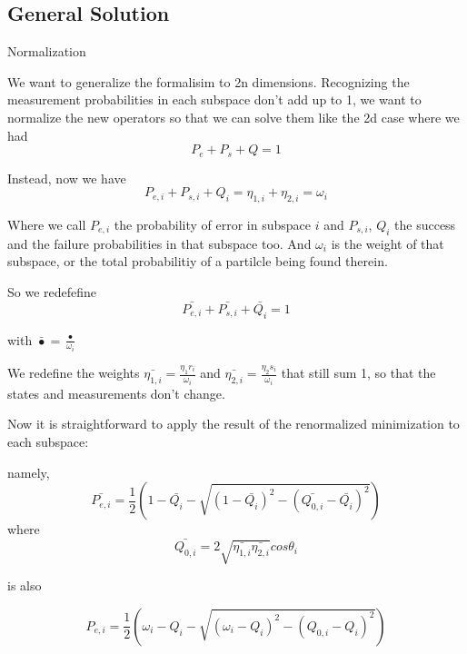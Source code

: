 \documentclass{beamer}
\begin{document}
\subsection{General Solution}

\begin{frame}{Normalization}

We want to generalize the formalisim to 2n dimensions.   Recognizing the measurement probabilities in each subspace don't add up to 1, we want to normalize the new operators so that we can solve them like the 2d case where we had
\[P_e+ P_s+ Q= 1\]

Instead, now we have
\[P_{e,i} + P_{s,i} + Q_i = \eta_{1,i} + \eta_{2,i} = \omega_i\]

Where we call $P_{e,i}$ the probability of error in subspace $i$ and $P_{s,i}$, $Q_i$ the success and the failure probabilities in that subspace too.  And $\omega_i$ is the weight of that subspace, or the total probabilitiy of a partilcle being found therein.

\end{frame}
\begin{frame}

So we redefefine
\[ \bar{P_{e,i}} +\bar{P_{s,i}} + \bar{Q_i} = 1 \]

with $ \bar{\bullet} = \frac{\bullet}{\omega_i} $

We redefine the weights $\bar{\eta_{1,i}} = \frac{\eta_1 r_i}{  \omega_i }$ and $ \bar{\eta_{2,i}} = \frac{ \eta_2 s_i }{\omega_i}$ that still sum 1, so that the states and measurements don't change.
\end{frame}
\begin{frame}

Now it is straightforward to apply the result of the renormalized minimization to each subspace: 

namely,
 \[\bar{P_{e,i}} = \frac{1}{2}( 1-\bar{Q_i} - \sqrt{(1-\bar{Q_i})^2 - (\bar{Q_{0,i}} -\bar{ Q_i})^2})\] where 
\[\bar{Q_{0,i}} = 2 \sqrt{\bar{\eta_{1,i}}\bar{\eta_{2,i}}}cos\theta_i\]

is also

\[P_{e,i}= \frac{1}{2}( \omega_i-Q_i - \sqrt{(\omega_i-Q_i)^2 - (Q_{0,i} - Q_i)^2})\]
\end{frame}
\end{document}
